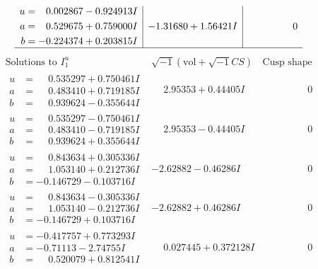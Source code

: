 \documentclass[1p]{elsarticle_modified}
\theoremstyle{definition}
\newcommand{\I}{\sqrt{-1}}
\begin{document}
$$\begin{array}{c|c|c}
\begin{aligned}
u &= \phantom{-}0.002867 - 0.924913 I \\
a &= \phantom{-}0.529675 + 0.759000 I \\
b &= -0.224374 + 0.203815 I\end{aligned}
 & -1.31680 + 1.56421 I & \phantom{-0.000000 } 0\\
 \hline 
 \end{array}$$\newpage$$\begin{array}{c|c|c}  
\text{Solutions to }I^u_{1}& \I (\text{vol} + \sqrt{-1}CS) & \text{Cusp shape}\\
 \hline 
\begin{aligned}
u &= \phantom{-}0.535297 + 0.750461 I \\
a &= \phantom{-}0.483410 + 0.719185 I \\
b &= \phantom{-}0.939624 - 0.355644 I\end{aligned}
 & \phantom{-}2.95353 + 0.44405 I & \phantom{-0.000000 } 0 \\ \hline\begin{aligned}
u &= \phantom{-}0.535297 - 0.750461 I \\
a &= \phantom{-}0.483410 - 0.719185 I \\
b &= \phantom{-}0.939624 + 0.355644 I\end{aligned}
 & \phantom{-}2.95353 - 0.44405 I & \phantom{-0.000000 } 0 \\ \hline\begin{aligned}
u &= \phantom{-}0.843634 + 0.305336 I \\
a &= \phantom{-}1.053140 + 0.212736 I \\
b &= -0.146729 - 0.103716 I\end{aligned}
 & -2.62882 - 0.46286 I & \phantom{-0.000000 } 0 \\ \hline\begin{aligned}
u &= \phantom{-}0.843634 - 0.305336 I \\
a &= \phantom{-}1.053140 - 0.212736 I \\
b &= -0.146729 + 0.103716 I\end{aligned}
 & -2.62882 + 0.46286 I & \phantom{-0.000000 } 0 \\ \hline\begin{aligned}
u &= -0.417757 + 0.773293 I \\
a &= -0.71113 - 2.74755 I \\
b &= \phantom{-}0.520079 + 0.812541 I\end{aligned}
 & \phantom{-}0.027445 + 0.372128 I & \phantom{-0.000000 } 0 \\ \hline\begin{aligned}

\end{aligned}
\end{array}$$
\end{document}
